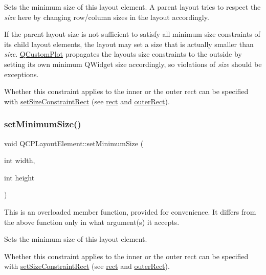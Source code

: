 Sets the minimum size of this layout element. A parent layout tries to respect the {\itshape size} here by changing row/column sizes in the layout accordingly.

If the parent layout size is not sufficient to satisfy all minimum size constraints of its child layout elements, the layout may set a size that is actually smaller than {\itshape size}. \hyperlink{classQCustomPlot}{Q\+Custom\+Plot} propagates the layout\textquotesingle{}s size constraints to the outside by setting its own minimum Q\+Widget size accordingly, so violations of {\itshape size} should be exceptions.

Whether this constraint applies to the inner or the outer rect can be specified with \hyperlink{classQCPLayoutElement_a361666cdcc6fbfd37344cc44be746b0f}{set\+Size\+Constraint\+Rect} (see \hyperlink{classQCPLayoutElement_a208effccfe2cca4a0eaf9393e60f2dd4}{rect} and \hyperlink{classQCPLayoutElement_a2a32a12a6161c9dffbadeb9cc585510c}{outer\+Rect}). \mbox{\label{classQCPLayoutElement_a8e0447614a0bf92de9a7304588c6b96e}} 
\subsubsection{\texorpdfstring{set\+Minimum\+Size()}{setMinimumSize()}\hspace{0.1cm}{\footnotesize\ttfamily [2/2]}}
{\footnotesize\ttfamily void Q\+C\+P\+Layout\+Element\+::set\+Minimum\+Size (\begin{DoxyParamCaption}\item[{int}]{width,  }\item[{int}]{height }\end{DoxyParamCaption})}

This is an overloaded member function, provided for convenience. It differs from the above function only in what argument(s) it accepts.

Sets the minimum size of this layout element.

Whether this constraint applies to the inner or the outer rect can be specified with \hyperlink{classQCPLayoutElement_a361666cdcc6fbfd37344cc44be746b0f}{set\+Size\+Constraint\+Rect} (see \hyperlink{classQCPLayoutElement_a208effccfe2cca4a0eaf9393e60f2dd4}{rect} and \hyperlink{classQCPLayoutElement_a2a32a12a6161c9dffbadeb9cc585510c}{outer\+Rect}). \mbox{\label{classQCPLayoutElement_a38975ea13e36de8e53391ce41d94bc0f}} 
